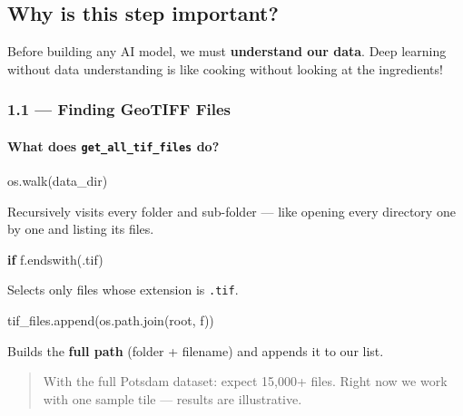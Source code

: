 \documentclass[11pt]{article}
\newenvironment{Shaded}{}{}
\newcommand{\StringTok}[1]{\textcolor[rgb]{0.25,0.44,0.63}{{#1}}}
\newcommand{\NormalTok}[1]{{#1}}
\newcommand{\ControlFlowTok}[1]{\textcolor[rgb]{0.00,0.44,0.13}{\textbf{{#1}}}}
\begin{document}
\subsection{Why is this step
important?}\label{why-is-this-step-important}

Before building any AI model, we must \textbf{understand our data}. Deep
learning without data understanding is like cooking without looking at
the ingredients!

    \subsubsection{1.1 --- Finding GeoTIFF
Files}\label{finding-geotiff-files}

\paragraph{\texorpdfstring{What does \texttt{get\_all\_tif\_files}
do?}{What does get\_all\_tif\_files do?}}\label{what-does-get_all_tif_files-do}

\begin{Shaded}
\begin{Highlighting}[]
\NormalTok{os.walk(data\_dir)}
\end{Highlighting}
\end{Shaded}

Recursively visits every folder and sub-folder --- like opening every
directory one by one and listing its files.

\begin{Shaded}
\begin{Highlighting}[]
\ControlFlowTok{if}\NormalTok{ f.endswith(}\StringTok{\textquotesingle{}.tif\textquotesingle{}}\NormalTok{)}
\end{Highlighting}
\end{Shaded}

Selects only files whose extension is \texttt{.tif}.

\begin{Shaded}
\begin{Highlighting}[]
\NormalTok{tif\_files.append(os.path.join(root, f))}
\end{Highlighting}
\end{Shaded}

Builds the \textbf{full path} (folder + filename) and appends it to our
list.

\begin{quote}
With the full Potsdam dataset: expect 15,000+ files. Right now we work
with one sample tile --- results are illustrative.
\end{quote}
\end{document}
